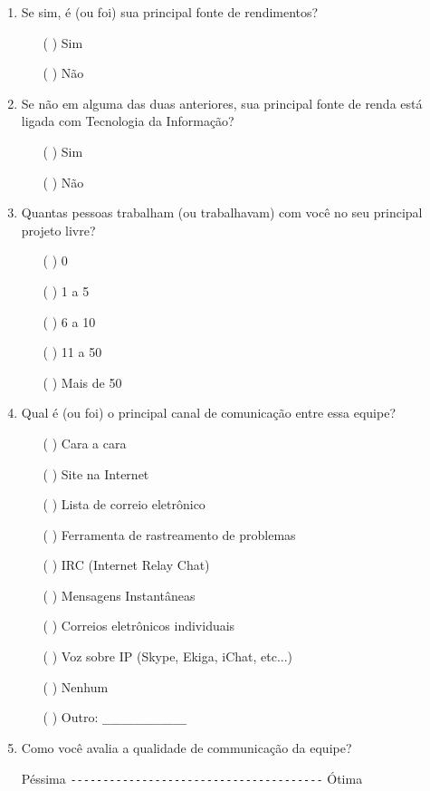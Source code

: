 \begin{enumerate}
\item Se sim, é (ou foi) sua principal fonte de rendimentos?
  \begin{itemize}
  \item[( )] Sim
  \item[( )] Não
  \end{itemize}

\item Se não em alguma das duas anteriores, sua principal fonte de
  renda está ligada com Tecnologia da Informação?
  \begin{itemize}
  \item[( )] Sim
  \item[( )] Não
  \end{itemize}

\item Quantas pessoas trabalham (ou trabalhavam) com você no seu
  principal projeto livre?
  \begin{itemize}
  \item[( )] 0
  \item[( )] 1 a 5
  \item[( )] 6 a 10
  \item[( )] 11 a 50
  \item[( )] Mais de 50
  \end{itemize}

\item Qual é (ou foi) o principal canal de comunicação entre essa
  equipe?
  \begin{itemize}
  \item[( )] Cara a cara
  \item[( )] Site na Internet
  \item[( )] Lista de correio eletrônico
  \item[( )] Ferramenta de rastreamento de problemas
  \item[( )] IRC (Internet Relay Chat)
  \item[( )] Mensagens Instantâneas
  \item[( )] Correios eletrônicos individuais
  \item[( )] Voz sobre IP (Skype, Ekiga, iChat, etc...)
  \item[( )] Nenhum
  \item[( )] Outro: \verb=_____________=
  \end{itemize}

\item Como você avalia a qualidade de communicação da equipe?

  Péssima \verb=---------------------------------------= Ótima


\end{enumerate}
